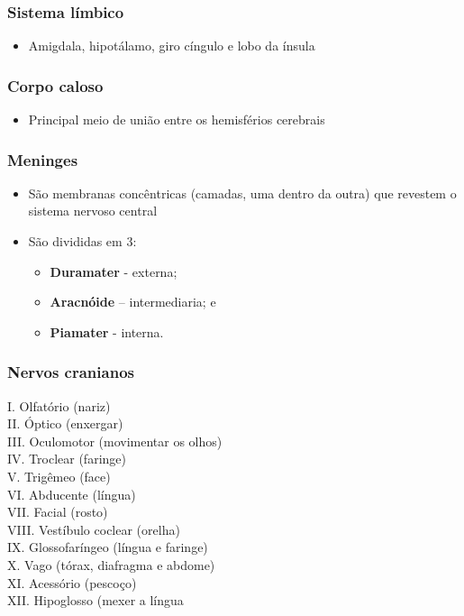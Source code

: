 \documentclass[
]{book}
\providecommand{\tightlist}{%
  \setlength{\itemsep}{0pt}\setlength{\parskip}{0pt}}
\begin{document}
\hypertarget{sistema-luxedmbico}{%
\subsubsection{Sistema límbico}\label{sistema-luxedmbico}}

\begin{itemize}
\tightlist
\item
  Amigdala, hipotálamo, giro cíngulo e lobo da ínsula
\end{itemize}

\hypertarget{corpo-caloso}{%
\subsubsection{Corpo caloso}\label{corpo-caloso}}

\begin{itemize}
\tightlist
\item
  Principal meio de união entre os hemisférios cerebrais
\end{itemize}

\hypertarget{meninges}{%
\subsubsection{Meninges}\label{meninges}}

\begin{itemize}
\tightlist
\item
  São membranas concêntricas (camadas, uma dentro da outra) que revestem o sistema nervoso central
\item
  São divididas em 3:

  \begin{itemize}
  \tightlist
  \item
    \textbf{Duramater} - externa;
  \item
    \textbf{Aracnóide} -- intermediaria; e
  \item
    \textbf{Piamater} - interna.
  \end{itemize}
\end{itemize}

\hypertarget{nervos-cranianos}{%
\subsubsection{Nervos cranianos}\label{nervos-cranianos}}

I. Olfatório (nariz)\\
II. Óptico (enxergar)\\
III. Oculomotor (movimentar os olhos)\\
IV. Troclear (faringe)\\
V. Trigêmeo (face)\\
VI. Abducente (língua)\\
VII. Facial (rosto)\\
VIII. Vestíbulo coclear (orelha)\\
IX. Glossofaríngeo (língua e faringe)\\
X. Vago (tórax, diafragma e abdome)\\
XI. Acessório (pescoço)\\
XII. Hipoglosso (mexer a língua
\end{document}
